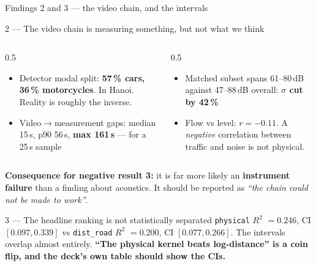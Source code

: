 \documentclass[aspectratio=169,10pt]{beamer}
\newcommand{\down}[1]{\textcolor{bad}{\textbf{#1}}}
\newcommand{\wn}[1]{\textcolor{warn}{\textbf{#1}}}
\newcommand{\rr}{$R^2$}
\begin{document}
\begin{frame}{Findings 2 and 3 --- the video chain, and the intervals}
  \begin{block}{2 --- The video chain is measuring something, but not what we think}
    \vspace{.5em}
    \begin{columns}[t]
      \begin{column}{0.5\textwidth}
        \begin{itemize}
          \item Detector modal split: \down{57\,\% cars, 36\,\% motorcycles}.
                In Hanoi. Reality is roughly the inverse.
          \item Video$\rightarrow$measurement gaps: median 15\,s, p90 56\,s,
                \textbf{max 161\,s} --- for a 25\,s sample
        \end{itemize}
      \end{column}
      \begin{column}{0.5\textwidth}
        \begin{itemize}
          \item Matched subset spans 61--80\,dB against 47--88\,dB overall:
                \textbf{$\sigma$ cut by 42\,\%}
          \item Flow vs level: $r = -0.11$. A \emph{negative} correlation between
                traffic and noise is not physical.
        \end{itemize}
      \end{column}
    \end{columns}
    \vspace{.3em}
    \textbf{Consequence for negative result 3:} it is far more likely an
    \wn{instrument failure} than a finding about acoustics. It should be reported as
    \emph{``the chain could not be made to work''}.
  \end{block}
  \begin{block}{3 --- The headline ranking is not statistically separated}
    \texttt{physical} \rr{} $=0.246$, CI $[0.097, 0.339]$ \quad vs \quad
    \texttt{dist\_road} \rr{} $=0.200$, CI $[0.077, 0.266]$.
    The intervals overlap almost entirely. \textbf{``The physical kernel beats
    log-distance'' is a coin flip, and the deck's own table should show the CIs.}
  \end{block}
\end{frame}
\end{document}
